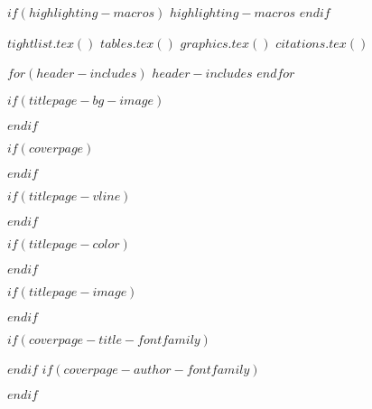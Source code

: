$if(highlighting-macros)$
$highlighting-macros$
$endif$

$tightlist.tex()$
$tables.tex()$
$graphics.tex()$
$citations.tex()$

$for(header-includes)$
$header-includes$
$endfor$

\usepackage[utf8]{inputenc} %
\usepackage[T1]{fontenc} %
\usepackage{babel}
\usepackage{hyphenat}

$if(titlepage-bg-image)$
\usepackage{graphicx}
\usepackage{wallpaper} %
\usepackage{geometry}
$endif$

$if(coverpage)$
\usepackage{graphicx}
\usepackage{geometry}
\usepackage{afterpage}
\usepackage{tikz}
\usetikzlibrary{calc}
\usetikzlibrary{fadings}
\usepackage[pagecolor=none]{pagecolor}
$endif$

$if(titlepage-vline)$
\usepackage{graphicx}
$endif$

$if(titlepage-color)$
\usepackage[pagecolor=none]{pagecolor}
$endif$

$if(titlepage-image)$
\usepackage{wallpaper} %
$endif$

$if(coverpage-title-fontfamily)$
\usepackage{fontspec}
$endif$
$if(coverpage-author-fontfamily)$
\usepackage{fontspec}
$endif$
